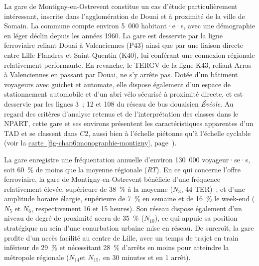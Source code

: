 \begin{refsegment}
La gare de Montigny-en-Ostrevent constitue un cas d'étude particulièrement intéressant, inscrite dans l'agglomération de Douai et à proximité de la ville de Somain. La commune compte environ 5~000 habitant·e·s, avec une démographie en léger déclin depuis les années 1960. La gare est desservie par la ligne ferroviaire reliant Douai à Valenciennes (P43) ainsi que par une liaison directe entre Lille Flandres et Saint-Quentin (K40), lui conférant une connexion régionale relativement performante. En revanche, le \acrshort{TERGV} de la ligne K43, reliant Arras à Valenciennes en passant par Douai, ne s'y arrête pas. Dotée d'un bâtiment voyageurs avec guichet et automate, elle dispose également d'un espace de stationnement automobile et d'un abri vélo sécurisé à proximité directe, et est desservie par les lignes 3~; 12 et 108 du réseau de bus douaisien \textsl{Évéole}. Au regard des critères d'analyse retenus et de l'interprétation des classes dans le \acrshort{NPART}, cette gare et ses environs présentent les caractéristiques apparentes d'un \acrshort{TAD} et se classent dans \(C2\), aussi bien à l'échelle piétonne qu'à l'échelle cyclable (voir la \hyperref[fig-chap6:monographie-montigny]{carte~\ref{fig-chap6:monographie-montigny}}, page~\pageref{fig-chap6:monographie-montigny}).%

La gare enregistre une fréquentation annuelle d'environ 130~000 voyageur·se·s, soit 60~\% de moins que la moyenne régionale (\(RT\)). En ce qui concerne l'offre ferroviaire, la gare de Montigny-en-Ostrevent bénéficie d'une fréquence relativement élevée, supérieure de 38~\% à la moyenne (\(N_{3}\), 44 \acrshort{TER})~; et d'une amplitude horaire élargie, supérieure de 7~\% en semaine et de 16~\% le week-end (\(N_{5}\) et \(N_{6}\), respectivement 16 et 15 heures). Son réseau dispose également d'un niveau de degré de proximité accru de 35~\% (\(N_{10}\)), ce qui appuie sa position stratégique au sein d'une conurbation urbaine mise en réseau. De surcroît, la gare profite d'un accès facilité au centre de Lille, avec un temps de trajet en train inférieur de 29~\% et nécessitant 28~\% d'arrêts en moins pour atteindre la métropole régionale (\(N_{14}\)et \(N_{15}\), en 30 minutes et en 1 arrêt).%


\end{refsegment}
